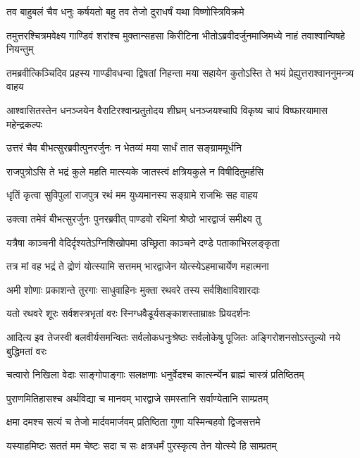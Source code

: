 \twolineshloka
{तव बाहुबलं चैव धनुः कर्षयतो बहु}
{तव तेजो दुराधर्षं यथा विष्णोस्त्रिविक्रमे}



\twolineshloka
{तमुत्तरश्चित्रमवेक्ष्य गाण्डिवं शरांश्च मुक्तान्सहसा किरीटिना}
{भीतोऽब्रवीदर्जुनमाजिमध्ये नाहं तवाश्वान्विषहे नियन्तुम्}


\twolineshloka
{तमब्रवीत्किञ्चिदिव प्रहस्य गाण्डीवधन्वा द्विषतां निहन्ता}
{मया सहायेन कुतोऽस्ति ते भयं प्रेह्युत्तराश्वाननुमन्त्र्य वाहय}



\twolineshloka
{आश्वासितस्तेन धनञ्जयेन वैराटिरश्वान्प्रतुतोदय शीघ्रम्}
{धनञ्जयश्चापि विकृष्य चापं विष्फारयामास महेन्द्रकल्पः}


\twolineshloka
{उत्तरं चैव बीभत्सुरब्रवीत्पुनरर्जुनः}
{न भेतव्यं मया सार्धं तात सङ्ग्राममूर्धनि}


\twolineshloka
{राजपुत्रोऽसि ते भद्रं कुले महति मात्स्यके}
{जातस्त्वं क्षत्रियकुले न विषीदितुमर्हसि}


\twolineshloka
{धृतिं कृत्वा सुविपुलां राजपुत्र रथं मम}
{युध्यमानस्य सङ्ग्रामे राजभिः सह वाहय}


\twolineshloka
{उक्त्वा तमेवं बीभत्सुरर्जुनः पुनरब्रवीत्}
{पाण्डवो रथिनां श्रेष्ठो भारद्वाजं समीक्ष्य तु}


\twolineshloka
{यत्रैषा काञ्चनी वेदिर्दृश्यतेऽग्निशिखोपमा}
{उच्छ्रिता काञ्चने दण्डे पताकाभिरलङ्कृता}


\twolineshloka
{तत्र मां वह भद्रं ते द्रोणं योत्स्यामि सत्तमम्}
{भारद्वाजेन योत्स्येऽहमाचार्येण महात्मना}


\twolineshloka
{अमी शोणाः प्रकाशन्ते तुरगाः साधुवाहिनः}
{मुक्ता रथवरे तस्य सर्वशिक्षाविशारदाः}


\twolineshloka
{यतो रथवरे शूरः सर्वशस्त्रभृतां वरः}
{स्निग्धवैडूर्यसङ्काशस्ताम्राक्षः प्रियदर्शनः}


\threelineshloka
{आदित्य इव तेजस्वी बलवीर्यसमन्वितः}
{सर्वलोकधनुःश्रेष्ठः सर्वलोकेषु पूजितः}
{अङ्गिरोशनसोऽस्तुल्यो नये बुद्धिमतां वरः}


\twolineshloka
{चत्वारो निखिला वेदाः साङ्गोपाङ्गाः सलक्षणाः}
{धनुर्वेदश्च कार्त्स्न्येन ब्राह्मं चास्त्रं प्रतिष्ठितम्}


\twolineshloka
{पुराणमितिहासश्च अर्थविद्या च मानवम्}
{भारद्वाजे समस्तानि सर्वाण्येतानि साम्प्रतम्}


\twolineshloka
{क्षमा दमश्च सत्यं च तेजो मार्दवमार्जवम्}
{प्रतिष्ठिता गुणा यस्मिन्बहवो द्विजसत्तमे}


\twolineshloka
{यस्याहमिष्टः सततं मम चेष्टः सदा च सः}
{क्षत्रधर्मं पुरस्कृत्य तेन योत्स्ये हि साम्प्रतम्}


